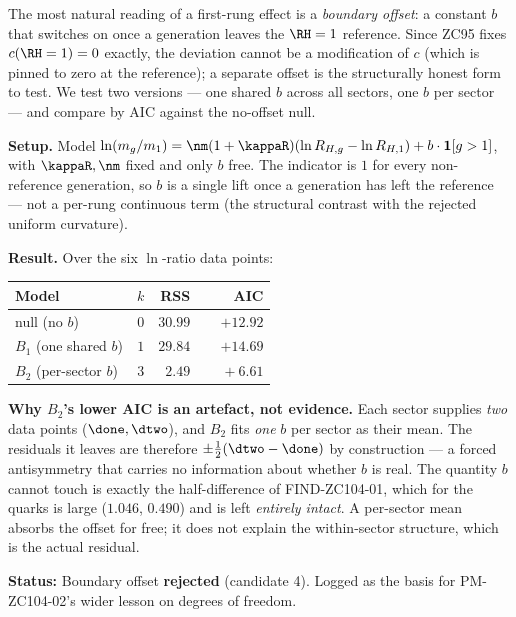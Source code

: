 \documentclass[12pt, a4paper]{article}
\begin{document}
The most natural reading of a first-rung effect is a \emph{boundary offset}: a
constant $b$ that switches on once a generation leaves the $\RH=1$ reference.
Since ZC95 fixes $c(\RH=1)=0$ exactly, the deviation cannot be a modification of
$c$ (which is pinned to zero at the reference); a separate offset is the
structurally honest form to test. We test two versions --- one shared $b$ across
all sectors, one $b$ per sector --- and compare by AIC against the no-offset null.

\begin{openqbox}[title={Boundary offset $b$: AIC-compared and excluded as artefact}]

\textbf{Setup.} Model $\ln(m_g/m_1)=\nm(1+\kappaR)(\ln R_{H,g}-\ln R_{H,1})
+b\cdot\mathbf{1}[g>1]$, with $\kappaR,\nm$ fixed and only $b$ free. The
indicator is $1$ for every non-reference generation, so $b$ is a single lift
once a generation has left the reference --- not a per-rung continuous term (the
structural contrast with the rejected uniform curvature).

\textbf{Result.} Over the six $\ln$-ratio data points:
\begin{center}
{\small\renewcommand{\arraystretch}{1.25}
\begin{tabular}{@{}lrrr@{}}
\toprule
Model & $k$ & RSS & AIC \\
\midrule
null (no $b$)        & $0$ & $30.99$ & $+12.92$ \\
$B_1$ (one shared $b$) & $1$ & $29.84$ & $+14.69$ \\
$B_2$ (per-sector $b$) & $3$ & $\phantom{0}2.49$ & $\phantom{+}+6.61$ \\
\bottomrule
\end{tabular}}
\end{center}

\textbf{Why $B_2$'s lower AIC is an artefact, not evidence.} Each sector supplies
\emph{two} data points ($\done,\dtwo$), and $B_2$ fits \emph{one} $b$ per sector
as their mean. The residuals it leaves are therefore $\pm\tfrac12(\dtwo-\done)$
by construction --- a forced antisymmetry that carries no information about
whether $b$ is real. The quantity $b$ cannot touch is exactly the half-difference
of FIND-ZC104-01, which for the quarks is large ($1.046$, $0.490$) and is left
\emph{entirely intact}. A per-sector mean absorbs the offset for free; it does
not explain the within-sector structure, which is the actual residual.

\textbf{Status:} Boundary offset \textbf{rejected} (candidate 4). Logged as the
basis for PM-ZC104-02's wider lesson on degrees of freedom.
\end{openqbox}
\end{document}
